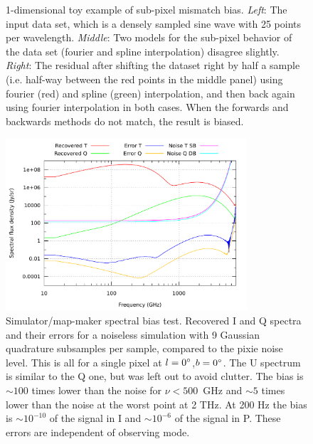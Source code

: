 \documentclass{article}
\begin{document}
\begin{figure}
\begin{tabular}{m{59mm}m{59mm}m{59mm}}
	\end{tabular}
	\caption{1-dimensional toy example of sub-pixel mismatch bias.
	\emph{Left}: The input data set, which is a densely sampled sine wave with
	25 points per wavelength. \emph{Middle}: Two models for the sub-pixel behavior
	of the data set (fourier and spline interpolation) disagree slightly.
	\emph{Right}: The residual after shifting the dataset right by half a sample
	(i.e. half-way between the red points in the middle panel) using fourier
	(red) and spline (green) interpolation, and then back again using fourier interpolation
	in both cases. When the forwards and backwards methods do not match, the result is biased.}
	\label{fig:iptoy}
\end{figure}

\begin{figure}
	\centering
	\includegraphics[width=0.8\textwidth]{plots/error_std_sb_abs_log_log.pdf}
	\caption{Simulator/map-maker spectral bias test. Recovered I and Q spectra and
	their errors for a noiseless simulation
	with 9 Gaussian quadrature subsamples per sample, compared to the pixie
	noise level. This is all for a single pixel at $l=0\degree$,$b=0\degree$.
	The U spectrum is similar to the Q one, but was left out to avoid clutter.
	The bias is $\sim 100$ times lower than the noise for $\nu<500$~GHz and
	$\sim 5$ times lower than the noise at the worst point at 2 THz. At 200
	Hz the bias is $\sim 10^{-10}$ of the signal in I and $\sim 10^{-6}$
	of the signal in P. These errors are independent of observing mode.}
	\label{fig:specbias}
\end{figure}
\end{document}
